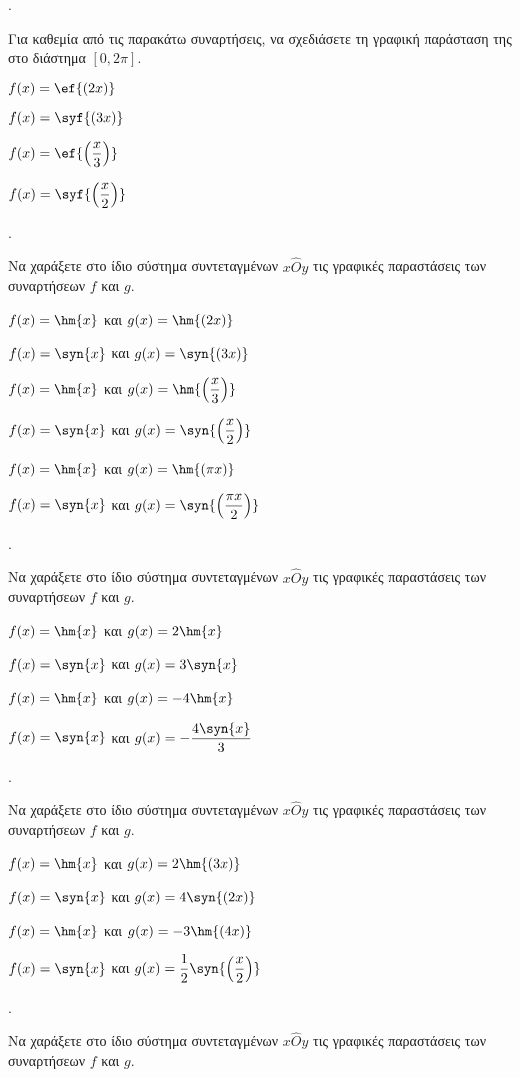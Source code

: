\documentclass[11pt,a4paper,twocolumn]{article}
\newcounter{askhsh}
\newcommand{\askhsh}{\large\theaskhsh.\ \addtocounter{askhsh}{1}}
\begin{document}
\askhsh Για καθεμία από τις παρακάτω συναρτήσεις, να σχεδιάσετε τη γραφική παράσταση της στο διάστημα $[0,2\pi]$.
\begin{multicols}{2}
\begin{alist}
\item $f(x)=\ef{(2x)}$
\item $f(x)=\syf{(3x)}$
\item $f(x)=\ef{\left(\dfrac{x}{3}\right)}$
\item $f(x)=\syf{\left(\dfrac{x}{2}\right)}$
\end{alist}
\end{multicols}
\askhsh Να χαράξετε στο ίδιο σύστημα συντεταγμένων $x\hat{O}y$ τις γραφικές παραστάσεις των συναρτήσεων $f$ και $g$.
\begin{alist}
\item $f(x)=\hm{x}$ και $g(x)=\hm{(2x)}$
\item $f(x)=\syn{x}$ και $g(x)=\syn{(3x)}$
\item $f(x)=\hm{x}$ και $g(x)=\hm{\left(\dfrac{x}{3}\right)}$
\item $f(x)=\syn{x}$ και $g(x)=\syn{\left(\dfrac{x}{2}\right)}$
\item $f(x)=\hm{x}$ και $g(x)=\hm{(\pi x)}$
\item $f(x)=\syn{x}$ και $g(x)=\syn{\left(\dfrac{\pi x}{2}\right)}$
\end{alist}
\askhsh Να χαράξετε στο ίδιο σύστημα συντεταγμένων $x\hat{O}y$ τις γραφικές παραστάσεις των συναρτήσεων $f$ και $g$.
\begin{alist}
\item $f(x)=\hm{x}$ και $g(x)=2\hm{x}$
\item $f(x)=\syn{x}$ και $g(x)=3\syn{x}$
\item $f(x)=\hm{x}$ και $g(x)=-4\hm{x}$
\item $f(x)=\syn{x}$ και $g(x)=-\dfrac{4\syn{x}}{3}$
\end{alist}
\askhsh Να χαράξετε στο ίδιο σύστημα συντεταγμένων $x\hat{O}y$ τις γραφικές παραστάσεις των συναρτήσεων $f$ και $g$.
\begin{alist}
\item $f(x)=\hm{x}$ και $g(x)=2\hm{(3x)}$
\item $f(x)=\syn{x}$ και $g(x)=4\syn{(2x)}$
\item $f(x)=\hm{x}$ και $g(x)=-3\hm{(4x)}$
\item $f(x)=\syn{x}$ και $g(x)=\dfrac{1}{2}\syn{\left(\dfrac{x}{2}\right)}$
\end{alist}
\askhsh Να χαράξετε στο ίδιο σύστημα συντεταγμένων $x\hat{O}y$ τις γραφικές παραστάσεις των συναρτήσεων $f$ και $g$.
\end{document}
